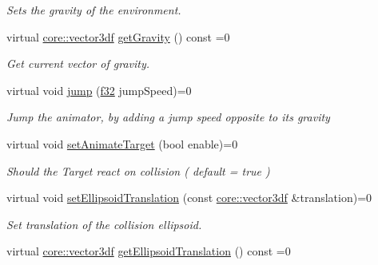 \begin{DoxyCompactItemize}
\begin{DoxyCompactList}\small\item\em Sets the gravity of the environment. \end{DoxyCompactList}\item 
virtual \hyperlink{namespaceirr_1_1core_a06f169d08b5c429f5575acb7edbad811}{core\+::vector3df} \hyperlink{classirr_1_1scene_1_1ISceneNodeAnimatorCollisionResponse_a1b7c86e8948691ce00f2aa6253c5683a}{get\+Gravity} () const =0
\begin{DoxyCompactList}\small\item\em Get current vector of gravity. \end{DoxyCompactList}\item 
virtual void \hyperlink{classirr_1_1scene_1_1ISceneNodeAnimatorCollisionResponse_a409b98d04be89fb06cce3384e0188abf}{jump} (\hyperlink{namespaceirr_a0277be98d67dc26ff93b1a6a1d086b07}{f32} jump\+Speed)=0
\begin{DoxyCompactList}\small\item\em \textquotesingle{}Jump\textquotesingle{} the animator, by adding a jump speed opposite to its gravity \end{DoxyCompactList}\item 
\mbox{\label{classirr_1_1scene_1_1ISceneNodeAnimatorCollisionResponse_a402cbe4934ad10f18762001458c939d9}} 
virtual void \hyperlink{classirr_1_1scene_1_1ISceneNodeAnimatorCollisionResponse_a402cbe4934ad10f18762001458c939d9}{set\+Animate\+Target} (bool enable)=0
\begin{DoxyCompactList}\small\item\em Should the Target react on collision ( default = true ) \end{DoxyCompactList}\item 
virtual void \hyperlink{classirr_1_1scene_1_1ISceneNodeAnimatorCollisionResponse_a234ec747d320d70dd3e2a4143782ffc7}{set\+Ellipsoid\+Translation} (const \hyperlink{namespaceirr_1_1core_a06f169d08b5c429f5575acb7edbad811}{core\+::vector3df} \&translation)=0
\begin{DoxyCompactList}\small\item\em Set translation of the collision ellipsoid. \end{DoxyCompactList}\item 
virtual \hyperlink{namespaceirr_1_1core_a06f169d08b5c429f5575acb7edbad811}{core\+::vector3df} \hyperlink{classirr_1_1scene_1_1ISceneNodeAnimatorCollisionResponse_aff0a2ad6ff375a85e08a3226e3267286}{get\+Ellipsoid\+Translation} () const =0

\end{DoxyCompactItemize}
